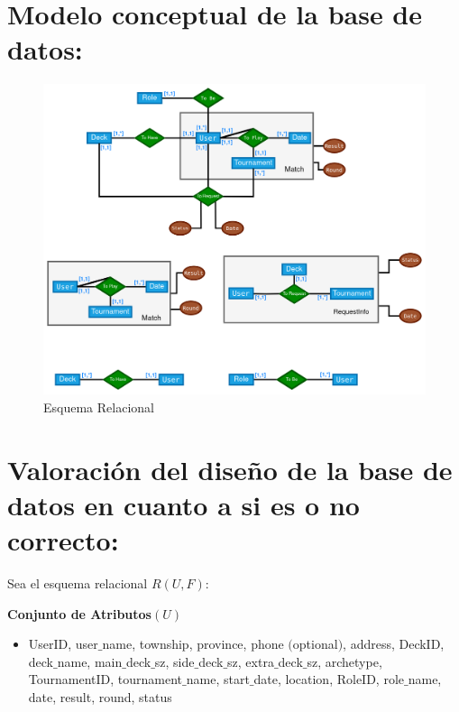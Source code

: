 \documentclass[a4paper]{article}
\begin{document}
\section{Modelo conceptual de la base de datos:}
\begin{figure}[h]
  \centering
  \includegraphics[width=1\textwidth]{design.png}
  \caption{Esquema Relacional}
  \label{fig:etiqueta}
\end{figure}
\newpage
\section{Valoraci\'on del dise\~no de la base de datos en cuanto a si es o no correcto:}

Sea el esquema relacional $R(U,F)$:

\textbf{Conjunto de Atributos}$(U)$
\begin{itemize}
  \item UserID, user$\_$name, township, province, phone $($optional$)$, address, DeckID, deck$\_$name, main$\_$deck$\_$sz, side$\_$deck$\_$sz, extra$\_$deck$\_$sz, archetype, TournamentID, tournament$\_$name, start$\_$date, location, RoleID, role$\_$name, date, result, round, status
\end{itemize}
\end{document}
